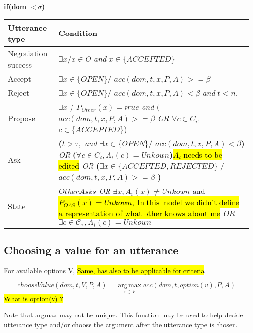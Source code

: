\documentclass{article}
\begin{document}
	\textbf{if(\textbf{dom  $<\sigma$})} \\
	\begin{tabular}{|p{3cm}|p{9cm}|}
		\hline
		\textbf{Utterance type} & Condition \\
		\hline
		Negotiation success &  $\exists x/ x \in O$ \emph{and} $x \in \{ACCEPTED\}$ \\
		\hline
		Accept & $\exists x \in \{OPEN\} /$ \newline $acc(dom,t,x,P,A) >= \beta$ \\
		\hline
		Reject & $\exists x \in \{OPEN\} /$ \newline $ acc(dom,t,x,P,A) < \beta$  \emph{and} $t<n$.\\
		\hline
		Propose & $\exists x$ / $P_{Other} (x)= true $  \emph{and}
		\newline ($acc(dom,t,x,P,A) >= \beta$
		\newline \emph{OR}  
		\newline $\forall c \in C_i$,  $c \in \{ACCEPTED\}$)\\
		\hline
		Ask &  \textbf{(}$t> \tau,$ \emph{and} 
		\newline $\exists x \in \{OPEN\} /$
		\newline $ acc(dom,t,x,P,A) < \beta $\textbf{) }
		\newline \emph{OR}
		\newline \textbf{(}$ \forall c \in C_i, A_i(c) = Unkown$\textbf{)}\hl{$A_i$ needs to be edited}
		\newline \emph{OR} 
		\newline \textbf{(}$\exists x \in \{ACCEPTED, REJECTED\}$ / 
		\newline $acc(dom,t,x,P,A) >= \beta$ \textbf{)} \\
		\hline
		
		State & $OtherAsks$
		\newline \emph{OR}
		\newline $\exists x,A_i(x) \not = Unkown $ and \hl{$P_{OAS}(x) = Unkown$, In this model we didn't define a representation of what other knows about me }
		\newline \emph{OR}
		\newline $ \exists c \in \mathcal{C}, , A_i(c) = Unkown$
		\\
		\hline
	\end{tabular}
	

	\subsection{Choosing a value for an utterance}
	
	For available options V, \hl {Same, has also to be applicable for criteria}
	
	 $$ chooseValue(dom, t, V, P, A) =	\operatorname*{arg\,max}_{v \in V} acc(dom, t, option(v), P, A) $$
	 \hl {What is option(v) ?}
	
	Note that argmax may not be unique.  This function may be used to help
	decide utterance type and/or choose the argument after the utterance
	type is chosen.

	
%	
%	
%	
	
\end{document}
